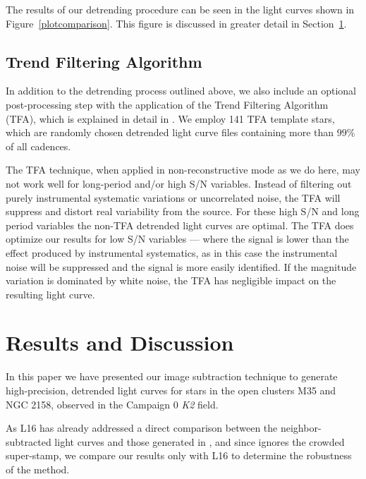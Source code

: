 \documentclass[apjl]{emulateapj}
\begin{document}
The results of our detrending procedure can be seen in the light curves
shown in Figure~\ref{plotcomparison}.  This figure is discussed in
greater detail in Section~\ref{sec:discussion}.

\subsection{Trend Filtering Algorithm}

In addition to the detrending process outlined above, we also include an
optional post-processing step with the application of the Trend
Filtering Algorithm (TFA), which is explained in detail in
\citet{Kovacs:2005}.  We employ 141 TFA template stars, which are
randomly chosen detrended light curve files containing more than $99\%$
of all cadences.

The TFA technique, when applied in non-reconstructive mode as we do
here, may not work well for long-period and/or high S/N variables.
Instead of filtering out purely instrumental systematic variations or
uncorrelated noise, the TFA will suppress and distort real variability
from the source.  For these high S/N and long period variables the
non-TFA detrended light curves are optimal.  The TFA does optimize our
results for low S/N variables --- where the signal is lower
than the effect produced by instrumental systematics, as in this case
the instrumental noise will be suppressed and the signal is more easily
identified.  If the magnitude variation is dominated by white noise, the
TFA has negligible impact on the resulting light curve.

\section{Results and Discussion}
\label{sec:discussion}

In this paper we have presented our image subtraction technique to
generate high-precision, detrended light curves for stars in the open
clusters M35 and NGC 2158, observed in the Campaign 0 \textit{K2} field.

As L16 has already addressed a direct comparison between the
neighbor-subtracted light curves and those generated in
\citet{Vanderburg:2014}, and since \citet{Vanderburg:2014} ignores the
crowded super-stamp, we compare our results only with L16 to determine
the robustness of the method.
\end{document}
